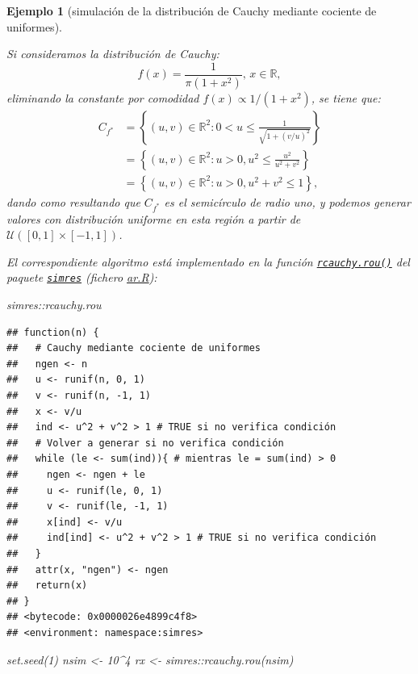 \documentclass[
]{book}
\newenvironment{Shaded}{\begin{snugshade}}{\end{snugshade}}
\newcommand{\DecValTok}[1]{\textcolor[rgb]{0.00,0.00,0.81}{#1}}
\newcommand{\FunctionTok}[1]{\textcolor[rgb]{0.00,0.00,0.00}{#1}}
\newcommand{\NormalTok}[1]{#1}
\newcommand{\OtherTok}[1]{\textcolor[rgb]{0.56,0.35,0.01}{#1}}
\newcommand{\SpecialCharTok}[1]{\textcolor[rgb]{0.00,0.00,0.00}{#1}}
\theoremstyle{break}
\newtheorem{example}{Ejemplo}[chapter]
\theoremstyle{nonumberplain}
\begin{document}
\begin{example}[simulación de la distribución de Cauchy mediante cociente de uniformes]
\protect\hypertarget{exm:cauchy-rou}{}\label{exm:cauchy-rou}

Si consideramos la distribución de Cauchy:
\[f(x) = \frac{1}{\pi (1 + x^2)} \text{, } x\in \mathbb{R},\]
eliminando la constante por comodidad \(f(x) \propto 1/(1 + x^2)\), se tiene que:
\[\begin{aligned}
C_{f^{\ast}} & = \left\{ (u, v) \in \mathbb{R}^{2} : 0 <u \leq \frac{1}{\sqrt{1 + (v/u)^2}}  \right\} \\
& = \left\{ (u, v) \in \mathbb{R}^{2} : u > 0, u^2 \leq \frac{u^2}{u^2 + v^2}  \right\} \\
& = \left\{ (u, v) \in \mathbb{R}^{2} : u > 0, u^2 + v^2 \leq 1  \right\}, 
\end{aligned}\]
dando como resultando que \(C_{f^{\ast}}\) es el semicírculo de radio uno, y podemos generar valores con distribución uniforme en esta región a partir de \(\mathcal{U}\left([0,1]\times[-1,1] \right)\).

El correspondiente algoritmo está implementado en la función \href{https://rubenfcasal.github.io/simres/reference/rcauchy.rou.html}{\texttt{rcauchy.rou()}} del paquete \href{https://rubenfcasal.github.io/simres}{\texttt{simres}} (fichero \href{R/ar.R}{\emph{ar.R}}):

\begin{Shaded}
\begin{Highlighting}[]
\NormalTok{simres}\SpecialCharTok{::}\NormalTok{rcauchy.rou}
\end{Highlighting}
\end{Shaded}

\begin{verbatim}
## function(n) {
##   # Cauchy mediante cociente de uniformes
##   ngen <- n
##   u <- runif(n, 0, 1)
##   v <- runif(n, -1, 1)
##   x <- v/u
##   ind <- u^2 + v^2 > 1 # TRUE si no verifica condición
##   # Volver a generar si no verifica condición
##   while (le <- sum(ind)){ # mientras le = sum(ind) > 0
##     ngen <- ngen + le
##     u <- runif(le, 0, 1)
##     v <- runif(le, -1, 1)
##     x[ind] <- v/u
##     ind[ind] <- u^2 + v^2 > 1 # TRUE si no verifica condición
##   }
##   attr(x, "ngen") <- ngen
##   return(x)
## }
## <bytecode: 0x0000026e4899c4f8>
## <environment: namespace:simres>
\end{verbatim}

\begin{Shaded}
\begin{Highlighting}[]
\FunctionTok{set.seed}\NormalTok{(}\DecValTok{1}\NormalTok{)}
\NormalTok{nsim }\OtherTok{\textless{}{-}} \DecValTok{10}\SpecialCharTok{\^{}}\DecValTok{4}
\NormalTok{rx }\OtherTok{\textless{}{-}}\NormalTok{ simres}\SpecialCharTok{::}\FunctionTok{rcauchy.rou}\NormalTok{(nsim)}


\end{Highlighting}
\end{Shaded}
\end{example}
\end{document}
